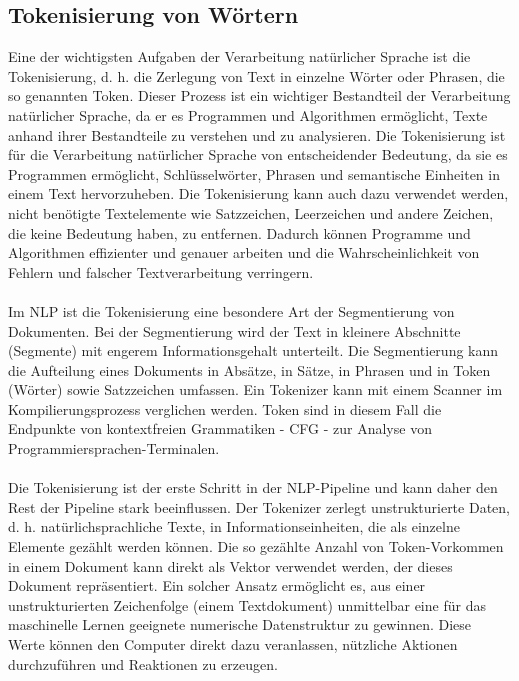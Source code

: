 \subsection{Tokenisierung von Wörtern}
Eine der wichtigsten Aufgaben der Verarbeitung natürlicher Sprache ist die Tokenisierung, d. h. die Zerlegung von Text in einzelne Wörter oder Phrasen, die so genannten Token. 
Dieser Prozess ist ein wichtiger Bestandteil der Verarbeitung natürlicher Sprache, da er es Programmen und Algorithmen ermöglicht, Texte anhand ihrer Bestandteile zu verstehen und zu analysieren. 
Die Tokenisierung ist für die Verarbeitung natürlicher Sprache von entscheidender Bedeutung, da sie es Programmen ermöglicht, Schlüsselwörter, Phrasen und semantische Einheiten in einem Text hervorzuheben. 
Die Tokenisierung kann auch dazu verwendet werden, nicht benötigte Textelemente wie Satzzeichen, Leerzeichen und andere Zeichen, die keine Bedeutung haben, zu entfernen. 
Dadurch können Programme und Algorithmen effizienter und genauer arbeiten und die Wahrscheinlichkeit von Fehlern und falscher Textverarbeitung verringern.\\\\
Im \ac{NLP} ist die Tokenisierung eine besondere Art der Segmentierung von Dokumenten. 
Bei der Segmentierung wird der Text in kleinere Abschnitte (Segmente) mit engerem Informationsgehalt unterteilt. 
Die Segmentierung kann die Aufteilung eines Dokuments in Absätze, in Sätze, in Phrasen und in Token (Wörter) sowie Satzzeichen umfassen. 
Ein Tokenizer kann mit einem Scanner im Kompilierungsprozess verglichen werden. 
Token sind in diesem Fall die Endpunkte von kontextfreien Grammatiken - \ac{CFG} - zur Analyse von Programmiersprachen-Terminalen.\\\\
Die Tokenisierung ist der erste Schritt in der \ac{NLP}-Pipeline und kann daher den Rest der Pipeline stark beeinflussen. 
Der Tokenizer zerlegt unstrukturierte Daten, d. h. natürlichsprachliche Texte, in Informationseinheiten, die als einzelne Elemente gezählt werden können. 
Die so gezählte Anzahl von Token-Vorkommen in einem Dokument kann direkt als Vektor verwendet werden, der dieses Dokument repräsentiert. 
Ein solcher Ansatz ermöglicht es, aus einer unstrukturierten Zeichenfolge (einem Textdokument) unmittelbar eine für das maschinelle Lernen geeignete numerische Datenstruktur zu gewinnen. 
Diese Werte können den Computer direkt dazu veranlassen, nützliche Aktionen durchzuführen und Reaktionen zu erzeugen.\\\\
